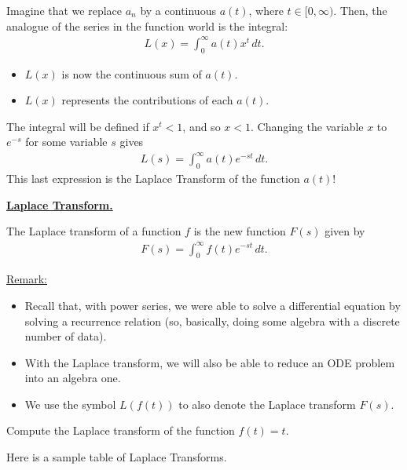 \documentclass[12pt,a4paper]{article}
\newcounter{example}[section]
\begin{document}
\begin{notes}
	
Imagine that we replace $a_n$ by a continuous $a(t)$, where $t \in [0, \infty )$. Then, the analogue of the series in the function world is the integral:
	\begin{align*}
	L(x) = \int_0^\infty a(t) x^t \, dt .
	\end{align*}
	\begin{itemize}
	\item $L(x)$ is now the continuous sum of $a(t)$.
	\item $L(x)$ represents the contributions of each $a(t)$.
	\end{itemize}
	
The integral will be defined if $x^t < 1$, and so $x < 1$. Changing the variable $x$ to $e^{-s}$ for some variable $s$ gives
	\begin{align*}
	L(s) = \int_0^\infty a(t) e^{-st} \, dt .
	\end{align*}
This last expression is the Laplace Transform of the function $a(t)$!

\underline{\textbf{Laplace Transform.}}

The Laplace transform of a function $f$ is the new function $F(s)$ given by
	\begin{align*}
	F(s) = \int_0^\infty f(t) e^{-st} \, dt .
	\end{align*}
\end{notes}
	
\vfill
	
\underline{Remark:}
	\begin{itemize}
	\item Recall that, with power series, we were able to solve a differential equation by solving a recurrence relation (so, basically, doing some algebra with a discrete number of data).
	\item With the Laplace transform, we will also be able to reduce an ODE problem into an algebra one.
	\item We use the symbol $L(f(t))$ to also denote the Laplace transform $F(s)$.
	\end{itemize}
	
\newpage

\begin{example}
Compute the Laplace transform of the function $f(t) = t$.
\end{example}

\vfill

Here is a sample table of Laplace Transforms.
\end{document}
